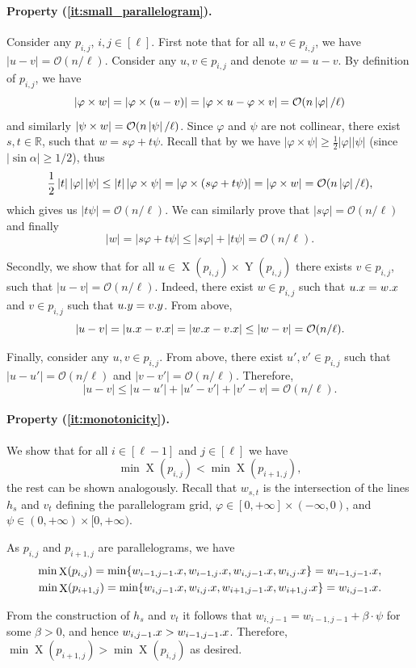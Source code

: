 \documentclass[11pt, letterpaper]{article}
\theoremstyle{plain}
\theoremstyle{definition}
\theoremstyle{remark}
\renewcommand{\O}{\mathcal{O}}
\renewcommand{\phi}{\varphi}
\DeclareMathOperator*{\X}{X}
\DeclareMathOperator*{\Y}{Y}
\newcommand{\absolute}[1]{\left\lvert#1\right\rvert}
\begin{document}
\paragraph*{Property (\ref{it:small_parallelogram}).}
Consider any $p_{i,j}$, $i,j \in [\ell]$. First note that	for all $u, v \in p_{i, j}$, we have $\absolute{u - v} = \O(n / \ell)$. Consider any $u, v \in p_{i, j}$ and denote $w = u - v$.
By definition of $p_{i, j}$, we have
\[ \absolute{\h{w}} = \absolute{\h{(u - v)}} = \absolute{\h{u} - \h{v}} = \O(n\absolute{\phi} / \ell) \]
and similarly $\absolute{\s{w}} = \O(n\absolute{\psi} / \ell)$. Since $\phi$ and $\psi$ are not collinear, there exist $s, t \in \mathbb{R}$, such that $w = s\phi + t\psi$. Recall that by  we have $\absolute{\phi \times \psi} \ge \frac{1}{2}\absolute{\phi}\absolute{\psi}$ (since $\absolute{\sin \alpha} \ge 1/2$), thus
\[ \frac{1}{2}\absolute{t}\absolute{\phi}\absolute{\psi} \le \absolute{t}\absolute{\phi \times \psi} = \absolute{\phi \times (s\phi + t\psi)} = \absolute{\h{w}} = \O(n\absolute{\phi} / \ell), \]
which gives us $\absolute{t\psi} = \O(n / \ell)$. We can similarly prove that $\absolute{s\phi} = \O(n / \ell)$ and finally 
\[ \absolute{w} = \absolute{s\phi + t\psi} \le \absolute{s\phi} + \absolute{t\psi} = \O(n / \ell). \]

Secondly, we show that	for all $u \in \X(p_{i, j}) \times \Y(p_{i, j})$ there exists $v \in p_{i, j}$, such that $\absolute{u - v} = \O(n / \ell)$. Indeed, there exist $w \in p_{i, j}$ such that $u.x = w.x$ and $v \in p_{i, j}$ such that $u.y = v.y$. From above, 
\[\absolute{u - v} = \absolute{\x{u} - \x{v}} = \absolute{\x{w} - \x{v}} \le \absolute{w - v} = \O(n / \ell).\] 

Finally, consider any $u, v \in p_{i, j}$. From above, there exist $u', v' \in p_{i, j}$ such that $\absolute{u - u'} = \O(n / \ell)$ and $\absolute{v - v'} = \O(n / \ell)$. Therefore, 
\[ \absolute{u - v} \le \absolute{u - u'} + \absolute{u' - v'} + \absolute{v' - v} = \O(n / \ell). \]

\paragraph*{Property (\ref{it:monotonicity}).} 
We show that for all $i \in [\ell - 1]$ and $j \in [\ell]$ we have
$$\min \X(p_{i, j}) < \min \X(p_{i + 1, j}),$$
the rest can be shown analogously. Recall that $w_{s,t}$ is the intersection of the lines $h_s$ and $v_t$ defining the parallelogram grid, $\phi \in [0, +\infty] \times (-\infty,0)$, and $\psi \in (0,+\infty) \times [0,+\infty)$. 

As $p_{i,j}$ and $p_{i+1,j}$ are parallelograms, we have 
\begin{align*}
\min \X(p_{i, j}) = \min\{\x{w_{i-1,j-1}}, \x{w_{i-1,j}}, \x{w_{i,j-1}},\x{w_{i,j}}\} = \x{w_{i-1,j-1}},\\ 
\min \X(p_{i+1, j}) = \min\{\x{w_{i,j-1}}, \x{w_{i,j}}, \x{w_{i+1,j-1}},\x{w_{i+1,j}}\} = \x{w_{i,j-1}}.
\end{align*}

From the construction of $h_s$ and $v_t$ it follows that $w_{i,j-1} = w_{i-1,j-1} + \beta \cdot \psi$ for some $\beta > 0$, and hence $w_{i,j-1}.x > w_{i-1,j-1}.x$. Therefore, $\min \X(p_{i+1, j}) > \min \X(p_{i, j})$ as desired. 
\end{document}
